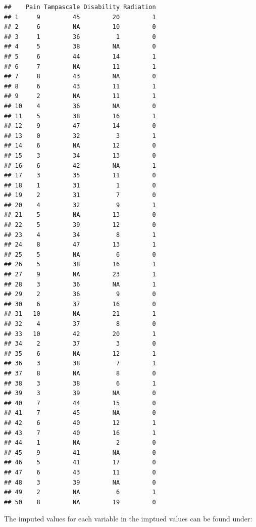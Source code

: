 \documentclass[]{book}
\newenvironment{Shaded}{\begin{snugshade}}{\end{snugshade}}
\newcommand{\OperatorTok}[1]{\textcolor[rgb]{0.81,0.36,0.00}{\textbf{#1}}}
\newcommand{\NormalTok}[1]{#1}
\begin{document}
\begin{verbatim}
##    Pain Tampascale Disability Radiation
## 1     9         45         20         1
## 2     6         NA         10         0
## 3     1         36          1         0
## 4     5         38         NA         0
## 5     6         44         14         1
## 6     7         NA         11         1
## 7     8         43         NA         0
## 8     6         43         11         1
## 9     2         NA         11         1
## 10    4         36         NA         0
## 11    5         38         16         1
## 12    9         47         14         0
## 13    0         32          3         1
## 14    6         NA         12         0
## 15    3         34         13         0
## 16    6         42         NA         1
## 17    3         35         11         0
## 18    1         31          1         0
## 19    2         31          7         0
## 20    4         32          9         1
## 21    5         NA         13         0
## 22    5         39         12         0
## 23    4         34          8         1
## 24    8         47         13         1
## 25    5         NA          6         0
## 26    5         38         16         1
## 27    9         NA         23         1
## 28    3         36         NA         1
## 29    2         36          9         0
## 30    6         37         16         0
## 31   10         NA         21         1
## 32    4         37          8         0
## 33   10         42         20         1
## 34    2         37          3         0
## 35    6         NA         12         1
## 36    3         38          7         1
## 37    8         NA          8         0
## 38    3         38          6         1
## 39    3         39         NA         0
## 40    7         44         15         0
## 41    7         45         NA         0
## 42    6         40         12         1
## 43    7         40         16         1
## 44    1         NA          2         0
## 45    9         41         NA         0
## 46    5         41         17         0
## 47    6         43         11         0
## 48    3         39         NA         0
## 49    2         NA          6         1
## 50    8         NA         19         0
\end{verbatim}

The imputed values for each variable in the imptued values can be found
under:

\begin{Shaded}
\end{Shaded}
\end{document}
